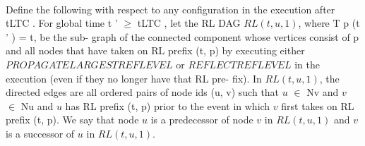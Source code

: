 \paragraph{}Define the following with respect to any configuration in the execution after tLTC . For global time t ' $\geq$ tLTC , let the RL DAG $RL (t, u, 1)$, where T p (t ' ) = t, be the sub- graph of the connected component whose vertices consist of p and all nodes that have taken on RL prefix (t, p) by executing either $PROPAGATELARGESTREFLEVEL$ or $REFLECTREFLEVEL$ in the execution (even if they no longer have that RL pre- fix). In $RL (t, u, 1)$, the directed edges are all ordered pairs of node ids (u, v) such that $u$ $\in$ Nv and $v$ $\in$ Nu and $u$ has RL prefix (t, p) prior to the event in which $v$ first takes on RL prefix (t, p). We say that node $u$ is a predecessor of node $v$ in $RL (t, u, 1)$ and $v$ is a successor of $u$ in $RL (t, u, 1)$.

